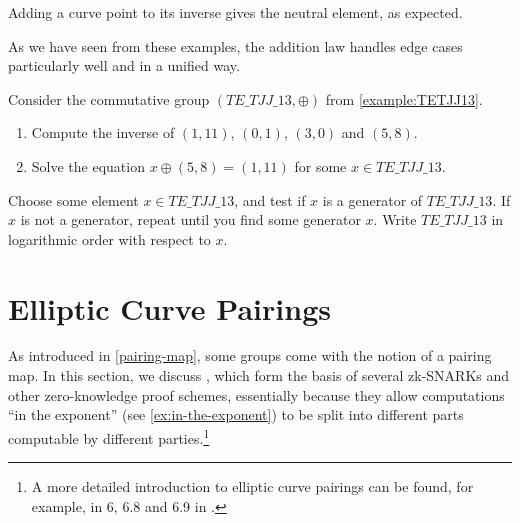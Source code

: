 \begin{example}
Adding a curve point to its inverse gives the neutral element, as expected. 


As we have seen from these examples, the  addition law handles edge cases particularly well and in a unified way.
\end{example}
\begin{exercise} Consider the commutative group $(TE\_TJJ\_13,\oplus)$ from \examplename{} \ref{example:TETJJ13}.
\begin{enumerate}
\item Compute the inverse of $(1,11)$, $(0,1)$, $(3,0)$ and $(5,8)$.
\item Solve the equation $x \oplus (5,8) = (1,11) $ for some $x\in \mathit{TE\_TJJ\_13}$.
\end{enumerate}
Choose some element $x\in \mathit{TE\_TJJ\_13}$, and test if $x$ is a generator of $\mathit{TE\_TJJ\_13}$. If $x$ is not a generator, repeat until you find some generator $x$. Write $\mathit{TE\_TJJ\_13}$ in logarithmic order with respect to $x$.
\end{exercise}

\section{Elliptic Curve Pairings}
\label{sec:elliptic_curve_pairings}
As introduced in \eqref{pairing-map}, some groups come with the notion of a pairing map. In this section, we discuss , which form the basis of several zk-SNARKs and other zero-knowledge proof schemes, essentially because they allow computations ``in the exponent'' (see \examplename{} \ref{ex:in-the-exponent}) to be split into different parts computable by different parties.\footnote{A more detailed introduction to elliptic curve pairings can be found, for example, in \chaptname{} 6, \secname{} 6.8 and 6.9 in \cite{hoffstein-2008}.}

